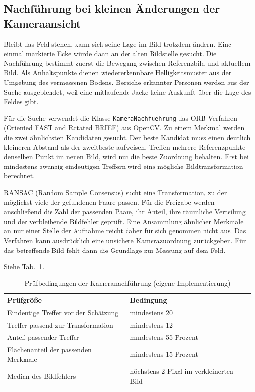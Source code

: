\subsection{Nachführung bei kleinen Änderungen der Kameraansicht}
Bleibt das Feld stehen, kann sich seine Lage im Bild trotzdem ändern. Eine einmal markierte Ecke würde dann an der alten Bildstelle gesucht. Die Nachführung bestimmt zuerst die Bewegung zwischen Referenzbild und aktuellem Bild. Als Anhaltspunkte dienen wiedererkennbare Helligkeitsmuster aus der Umgebung des vermessenen Bodens. Bereiche erkannter Personen werden aus der Suche ausgeblendet, weil eine mitlaufende Jacke keine Auskunft über die Lage des Feldes gibt.

Für die Suche verwendet die Klasse \lstinline|KameraNachfuehrung| das ORB-Verfahren (Oriented FAST and Rotated BRIEF) aus OpenCV. Zu einem Merkmal werden die zwei ähnlichsten Kandidaten gesucht. Der beste Kandidat muss einen deutlich kleineren Abstand als der zweitbeste aufweisen. Treffen mehrere Referenzpunkte denselben Punkt im neuen Bild, wird nur die beste Zuordnung behalten. Erst bei mindestens zwanzig eindeutigen Treffern wird eine mögliche Bildtransformation berechnet.

RANSAC (Random Sample Consensus) sucht eine Transformation, zu der möglichst viele der gefundenen Paare passen. Für die Freigabe werden anschließend die Zahl der passenden Paare, ihr Anteil, ihre räumliche Verteilung und der verbleibende Bildfehler geprüft. Eine Ansammlung ähnlicher Merkmale an nur einer Stelle der Aufnahme reicht daher für sich genommen nicht aus. Das Verfahren kann ausdrücklich eine unsichere Kamerazuordnung zurückgeben. Für das betreffende Bild fehlt dann die Grundlage zur Messung auf dem Feld.

Siehe Tab.~\ref{tab:em-kamera}.
\begin{table}[htbp]\centering\caption{Prüfbedingungen der Kameranachführung (eigene Implementierung)}\label{tab:em-kamera}
\begin{tabular}{@{}ll@{}}\toprule Prüfgröße & Bedingung\\\midrule
Eindeutige Treffer vor der Schätzung & mindestens 20\\
Treffer passend zur Transformation & mindestens 12\\
Anteil passender Treffer & mindestens 55 Prozent\\
Flächenanteil der passenden Merkmale & mindestens 15 Prozent\\
Median des Bildfehlers & höchstens 2 Pixel im verkleinerten Bild\\\bottomrule\end{tabular}\end{table}

